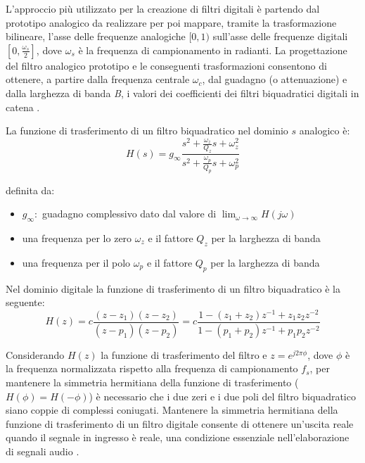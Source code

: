 \documentclass[12pt]{report}
\begin{document}
L'approccio più utilizzato per la creazione di filtri digitali è partendo dal prototipo analogico da realizzare per poi mappare, tramite la trasformazione bilineare, l'asse delle frequenze analogiche \([0,1)\) sull'asse delle frequenze digitali \([0,\frac{\omega_s}{2}]\), dove \(\omega_s\) è la frequenza di campionamento in radianti.
La progettazione del filtro analogico prototipo e le conseguenti trasformazioni consentono di ottenere, a partire dalla frequenza centrale \(\omega_c\), dal guadagno (o attenuazione) e dalla larghezza di banda \textit{B}, i valori dei coefficienti dei filtri biquadratici digitali in catena \parencite{reiss2010design}.

La funzione di trasferimento di un filtro biquadratico nel dominio \( s \) analogico è:
\begin{equation}
    H(s)=g_\infty\frac{s^2 + \frac{\omega_z}{Q_z}s + \omega_z^2}{s^2 + \frac{\omega_p}{Q_p}s + \omega_p^2}
    \label{eq:analog_biquad}
\end{equation}

definita da:
\begin{itemize}
    \item \(g_\infty: \) guadagno complessivo dato dal valore di \(\displaystyle \lim_{\omega \to \infty} H(j\omega) \)
    \item una frequenza per lo zero \(\omega_z\) e il fattore \(Q_z\) per la larghezza di banda
    \item una frequenza per il polo \(\omega_p\) e il fattore \(Q_p\) per la larghezza di banda
\end{itemize}
\parencite{christensen2003generalization}

Nel dominio digitale la funzione di trasferimento di un filtro biquadratico è la seguente:
\begin{equation}
    H(z)=c\frac{(z-z_1)(z-z_2)}{(z-p_1)(z-p_2)} = c\frac{1-(z_1+z_2)z^{-1} + z_1z_2z^{-2}}{1-(p_1+p_2)z^{-1} + p_1p_2z^{-2}}
    \label{eq:non_simmetric_digital_biquad}
\end{equation}
\parencite{reiss2010design}

Considerando \( H(z) \) la funzione di trasferimento del filtro e \( z = e^{j2\pi \phi} \), dove \( \phi \) è la frequenza normalizzata rispetto alla frequenza di campionamento \( f_s \), per mantenere la simmetria hermitiana della funzione di trasferimento (\( H(\phi) = H(-\phi) \)) è necessario che i due zeri e i due poli del filtro biquadratico siano coppie di complessi coniugati. Mantenere la simmetria hermitiana della funzione di trasferimento di un filtro digitale consente di ottenere un'uscita reale quando il segnale in ingresso è reale, una condizione essenziale nell’elaborazione di segnali audio \parencite{pedersini2020elementi}.
\end{document}
